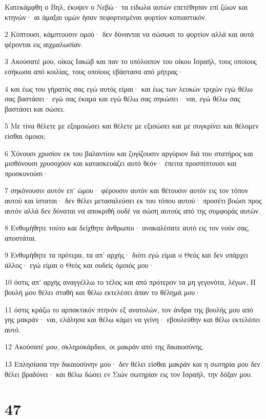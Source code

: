 \par Κατεκάμφθη ο Βηλ, έκυψεν ο Νεβώ· τα είδωλα αυτών επετέθησαν επί ζώων και κτηνών· αι άμαξαι υμών ήσαν πεφορτισμέναι φορτίον κοπιαστικόν.
\par 2 Κύπτουσι, κάμπτουσιν ομού· δεν δύνανται να σώσωσι το φορτίον αλλά και αυτά φέρονται εις αιχμαλωσίαν.
\par 3 Ακούσατέ μου, οίκος Ιακώβ και παν το υπόλοιπον του οίκου Ισραήλ, τους οποίους εσήκωσα από κοιλίας, τους οποίους εβάστασα από μήτρας·
\par 4 και έως του γήρατός σας εγώ αυτός είμαι· και έως των λευκών τριχών εγώ θέλω σας βαστάσει· εγώ σας έκαμα και εγώ θέλω σας σηκώσει· ναι, εγώ θέλω σας βαστάσει και σώσει.
\par 5 Με τίνα θέλετε με εξομοιώσει και θέλετε με εξισώσει και με συγκρίνει και θέλομεν είσθαι όμοιοι;
\par 6 Χύνουσι χρυσίον εκ του βαλαντίου και ζυγίζουσιν αργύριον διά του στατήρος και μισθόνουσι χρυσοχόον και κατασκευάζει αυτό θεόν· έπειτα προσπίπτουσι και προσκυνούσι·
\par 7 σηκόνουσιν αυτόν επ' ώμου· φέρουσιν αυτόν και θέτουσιν αυτόν εις τον τόπον αυτού και ίσταται· δεν θέλει μετασαλεύσει εκ του τόπου αυτού· προσέτι βοώσι προς αυτόν αλλά δεν δύναται να αποκριθή ουδέ να σώση αυτούς από της συμφοράς αυτών.
\par 8 Ενθυμήθητε τούτο και δείχθητε άνθρωποι· ανακαλέσατε αυτό εις τον νούν σας, αποστάται.
\par 9 Ενθυμήθητε τα πρότερα, τα απ' αρχής· διότι εγώ είμαι ο Θεός και δεν υπάρχει άλλος· εγώ είμαι ο Θεός και ουδείς όμοιός μου·
\par 10 όστις απ' αρχής αναγγέλλω το τέλος και από πρότερον τα μη γεγονότα, λέγων, Η βουλή μου θέλει σταθή και θέλω εκτελέσει άπαν το θέλημά μου·
\par 11 όστις κράζω το αρπακτικόν πτηνόν εξ ανατολών, τον άνδρα της βουλής μου από γης μακράν· ναι, ελάλησα και θέλω κάμει να γείνη· εβουλεύθην και θέλω εκτελέσει αυτό.
\par 12 Ακούσατέ μου, σκληροκάρδιοι, οι μακράν από της δικαιοσύνης.
\par 13 Επλησίασα την δικαιοσύνην μου· δεν θέλει είσθαι μακράν και η σωτηρία μου δεν θέλει βραδύνει· και θέλω δώσει εν Σιών σωτηρίαν εις τον Ισραήλ, την δόξαν μου.

\chapter{47}

